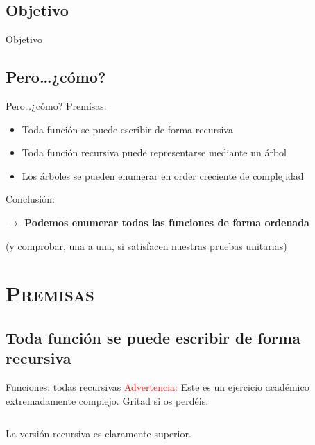 \documentclass[xcolor=x11names,compress]{beamer}
\renewcommand{\(}{\begin{columns}}
\renewcommand{\)}{\end{columns}}
\newcommand{\<}[1]{\begin{column}{#1}}
\renewcommand{\>}{\end{column}}
\begin{document}
\subsection{Objetivo}
\begin{frame}{Objetivo}
    \pause
    \codeFactorialTarget
\end{frame}


\subsection{Pero\ldots ¿cómo?}
\begin{frame}{Pero\ldots ¿cómo?}
    Premisas:
    \pause
    \begin{itemize}
        \item Toda función se puede escribir de forma recursiva \pause
        \item Toda función recursiva puede representarse mediante un árbol \pause
        \item Los árboles se pueden enumerar en order creciente de complejidad \pause
    \end{itemize}
    Conclusión:

    \textbf{$\rightarrow$ Podemos enumerar todas las funciones de forma ordenada} \pause

    (y comprobar, una a una, si satisfacen nuestras pruebas unitarias)
\end{frame}


\section{\scshape Premisas}

\subsection{Toda función se puede escribir de forma recursiva}
\begin{frame}{Funciones: todas recursivas}
    \textcolor{red}{Advertencia:} Este es un ejercicio académico \pause extremadamente complejo\pause. Gritad si os perdéis. \pause
    \begin{columns}
        \begin{column}{.30\linewidth}
        \begin{block}
            \codeLengthIteration
        \end{block}
        \end{column}
        \begin{column}{.65\linewidth}
        \begin{block}
            \codeLengthRecursion
        \end{block}
        \end{column}
    \end{columns} \pause
    La versión recursiva es claramente superior.
\end{frame}
\end{document}
